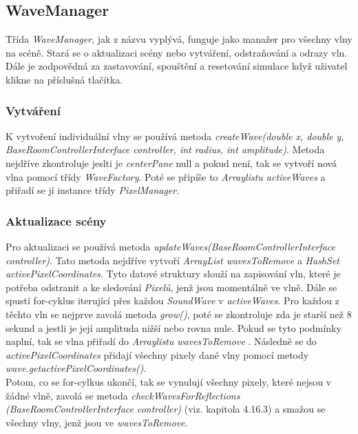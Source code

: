 \subsection{WaveManager}
Třída \textit{WaveManager}, jak z názvu vyplývá, funguje jako manažer pro všechny vlny na scéně. Stará se o aktualizaci scény nebo vytváření, odstraňování a odrazy vln. Dále je zodpovědná za zastavování, spouštění a resetování simulace když uživatel klikne na příslušná tlačítka.

\subsubsection{Vytváření}
K vytvoření individuální vlny se používá metoda \textit{createWave(double x, double y, BaseRoomControllerInterface controller, int radius, int amplitude)}. Metoda nejdříve zkontroluje jeslti je \textit{centerPane} null a pokud není, tak se vytvoří nová vlna pomocí třídy \textit{WaveFactory}. Poté se připíše to \textit{Arraylistu activeWaves} a  přiřadí se jí instance třídy \textit{PixelManager}. 

\subsubsection{Aktualizace scény}
Pro aktualizaci se používá metoda \textit{updateWaves(BaseRoomControllerInterface controller)}. Tato metoda nejdříve vytvoří \textit{ArrayList wavesToRemove} a \textit{HashSet activePixelCoordinates}. Tyto datové struktury slouží na zapisování vln, které je potřeba odstranit a ke sledování \textit{Pixelů}, jenž jsou momentálně ve vlně. Dále se spustí for-cyklus iterující přes každou \textit{SoundWave} v \textit{activeWaves}. Pro každou z těchto vln se nejprve zavolá metoda \textit{grow()}, poté se zkontroluje zda je starší než 8 sekund a jestli je její amplituda  nižší nebo rovna nule. Pokud se tyto podmínky naplní, tak se vlna přiřadí do \textit{Arraylistu wavesToRemove} .  Následně se do \textit{activePixelCoordinates} přidají všechny pixely dané vlny pomocí metody \textit{wave.getactivePixelCoordinates()}. \\
Potom, co se for-cylkus ukončí, tak se vynulují všechny pixely, které nejsou v žádné vlně,  zavolá se metoda \textit{checkWavesForReflections\\(BaseRoomControllerInterface controller)} (viz. kapitola 4.16.3) a smažou se všechny vlny, jenž jsou ve \textit{wavesToRemove}.


